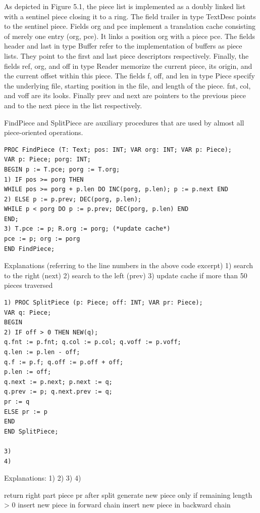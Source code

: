 As depicted in Figure 5.1, the piece list is implemented as a doubly linked list with a sentinel piece
closing it to a ring. The field trailer in type TextDesc points to the sentinel piece. Fields org and pce
implement a translation cache consisting of merely one entry (org, pce). It links a position org with a
piece pce. The fields header and last in type Buffer refer to the implementation of buffers as piece
lists. They point to the first and last piece descriptors respectively. Finally, the fields ref, org, and off
in type Reader memorize the current piece, its origin, and the current offset within this piece.
The fields f, off, and len in type Piece specify the underlying file, starting position in the file, and
length of the piece. fnt, col, and voff are its looks. Finally prev and next are pointers to the previous
piece and to the next piece in the list respectively.

FindPiece and SplitPiece are auxiliary procedures that are used by almost all piece-oriented
operations.
\begin{verbatim}
PROC FindPiece (T: Text; pos: INT; VAR org: INT; VAR p: Piece);
VAR p: Piece; porg: INT;
BEGIN p := T.pce; porg := T.org;
1) IF pos >= porg THEN
WHILE pos >= porg + p.len DO INC(porg, p.len); p := p.next END
2) ELSE p := p.prev; DEC(porg, p.len);
WHILE p < porg DO p := p.prev; DEC(porg, p.len) END
END;
3) T.pce := p; R.org := porg; (*update cache*)
pce := p; org := porg
END FindPiece;
\end{verbatim}

Explanations (referring to the line numbers in the above code excerpt)
1) search to the right (next)
2) search to the left (prev)
3) update cache if more than 50 pieces traversed
\begin{verbatim}
1) PROC SplitPiece (p: Piece; off: INT; VAR pr: Piece);
VAR q: Piece;
BEGIN
2) IF off > 0 THEN NEW(q);
q.fnt := p.fnt; q.col := p.col; q.voff := p.voff;
q.len := p.len - off;
q.f := p.f; q.off := p.off + off;
p.len := off;
q.next := p.next; p.next := q;
q.prev := p; q.next.prev := q;
pr := q
ELSE pr := p
END
END SplitPiece;

3)
4)
\end{verbatim}

Explanations:
1)
2)
3)
4)

return right part piece pr after split
generate new piece only if remaining length > 0
insert new piece in forward chain
insert new piece in backward chain

